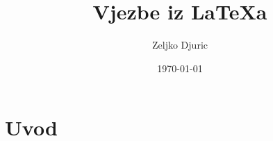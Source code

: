 \documentclass[12pt]{scrartcl}
\begin{document}
    \title{Vjezbe iz \LaTeX a}
    \author{Zeljko Djuric}
    \date{\today}
    \maketitle
    \section{Uvod}
\end{document}
